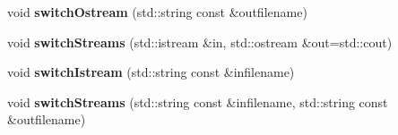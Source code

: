 \begin{DoxyCompactItemize}
\item 
\hypertarget{classScannerBase_a8afc45efc1ed7b3d3c72ed10abf9042e}{void {\bfseries switch\+Ostream} (std\+::string const \&outfilename)}\label{classScannerBase_a8afc45efc1ed7b3d3c72ed10abf9042e}

\item 
\hypertarget{classScannerBase_a4055b5f788140f12de27708c2a451860}{void {\bfseries switch\+Streams} (std\+::istream \&in, std\+::ostream \&out=std\+::cout)}\label{classScannerBase_a4055b5f788140f12de27708c2a451860}

\item 
\hypertarget{classScannerBase_af2124b7be3b7ff080409983ed54704f3}{void {\bfseries switch\+Istream} (std\+::string const \&infilename)}\label{classScannerBase_af2124b7be3b7ff080409983ed54704f3}

\item 
\hypertarget{classScannerBase_ac5badcfe2ac5fb640a8c18b2fe8c4a41}{void {\bfseries switch\+Streams} (std\+::string const \&infilename, std\+::string const \&outfilename)}\label{classScannerBase_ac5badcfe2ac5fb640a8c18b2fe8c4a41}

\end{DoxyCompactItemize}
